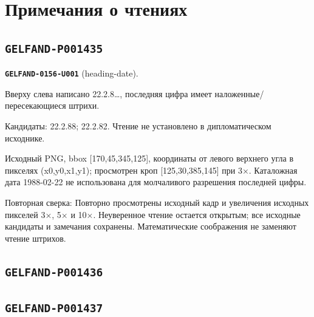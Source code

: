 \section*{Примечания о чтениях}
\subsection*{\texttt{GELFAND-P001435}}
\par\noindent\leavevmode{}\label{GELFAND-0156-U001}\label{GELFAND-P001435:heading-date}\textbf{\texttt{GELFAND-0156-U001}} (heading-date).\nopagebreak[4]\par
Вверху слева написано 22.2.8…, последняя цифра имеет наложенные/пересекающиеся штрихи.\par
Кандидаты: 22.2.88; 22.2.82. Чтение не установлено в дипломатическом исходнике.\par
Исходный PNG, bbox [170,45,345,125], координаты от левого верхнего угла в пикселях (x0,y0,x1,y1); просмотрен кроп [125,30,385,145] при 3×. Каталожная дата 1988-02-22 не использована для молчаливого разрешения последней цифры.\par
Повторная сверка: Повторно просмотрены исходный кадр и увеличения исходных пикселей 3×, 5× и 10×. Неуверенное чтение остается открытым; все исходные кандидаты и замечания сохранены. Математические соображения не заменяют чтение штрихов.\par\medskip
\subsection*{\texttt{GELFAND-P001436}}
\subsection*{\texttt{GELFAND-P001437}}
